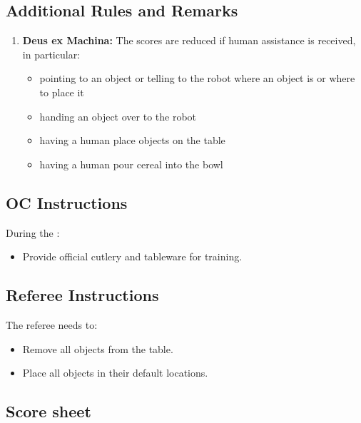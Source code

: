 \subsection*{Additional Rules and Remarks}
\begin{enumerate}[nosep]
	\item \textbf{Deus ex Machina:} The scores are reduced if human assistance is received, in particular:
	\begin{itemize}[nosep]
		\item pointing to an object or telling to the robot where an object is or where to place it
		\item handing an object over to the robot
		\item having a human place objects on the table
		\item having a human pour cereal into the bowl
	\end{itemize}
\end{enumerate}

\subsection*{OC Instructions}

During the \SetupDays:
\begin{itemize}
	\item Provide official cutlery and tableware for training.
\end{itemize}

\subsection*{Referee Instructions}

The referee needs to:
\begin{itemize}
	\item Remove all objects from the table.
	\item Place all objects in their default locations.
\end{itemize}

\subsection*{Score sheet}


